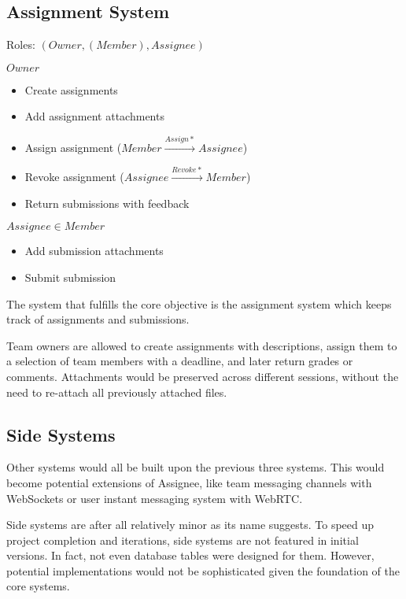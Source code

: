\subsection{Assignment System}
\label{overview.capab.assign}

Roles: $(Owner, (Member), Assignee)$

$Owner$
\begin{itemize}
	\item Create assignments

	\item Add assignment attachments

	\item Assign assignment ($Member\xrightarrow{Assign*}Assignee$)

	\item Revoke assignment ($Assignee\xrightarrow{Revoke*}Member$)

	\item Return submissions with feedback
\end{itemize}

$Assignee\in{}Member$
\begin{itemize}
	\item Add submission attachments

	\item Submit submission
\end{itemize}

The system that fulfills the core objective is the assignment system which keeps
track of assignments and submissions.

Team owners are allowed to create assignments with descriptions, assign them to
a selection of team members with a deadline, and later return grades or comments.
Attachments would be preserved across different sessions, without the need to re-attach
all previously attached files.

\subsection{Side Systems \textdagger{}}
\label{overview.capab.side}

Other systems would all be built upon the previous three systems. This would become
potential extensions of Assignee, like team messaging channels with WebSockets
or user instant messaging system with WebRTC.

\textdagger{} Side systems are after all relatively minor as its name suggests.
To speed up project completion and iterations, side systems are not featured in initial
versions. In fact, not even database tables were designed for them. However, potential
implementations would not be sophisticated given the foundation of the core systems.

